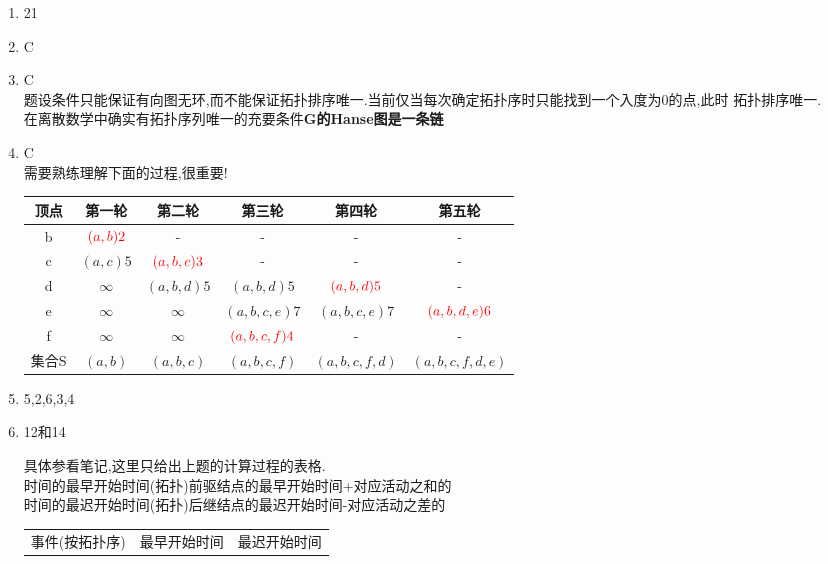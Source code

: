 \documentclass[12pt, a4paper, oneside, UTF8]{ctexbook}
\begin{document}
\begin{enumerate}[label=\arabic*.\textbf{答案}:]
\begin{center}
\begin{tikzpicture}[node distance=1.8cm,
                every node/.style={circle,draw,minimum size=6mm}]
        \end{tikzpicture}
    \end{center}
    \item 21
    \item C
    \item C \\
    题设条件只能保证有向图无环,而不能保证拓扑排序唯一.当前仅当每次确定拓扑序时只能找到一个入度为0的点,此时
    拓扑排序唯一.  \\
    在离散数学中确实有拓扑序列唯一的充要条件\textbf{G的Hanse图是一条链}
    \item C \\
    需要熟练理解下面的过程,很重要! 
    \begin{center}
    \begin{tabular}{c|c|c|c|c|c}
        \hline
        顶点 & 第一轮 & 第二轮 & 第三轮 & 第四轮 & 第五轮 \\
        \hline 
        b & $\color{red}(a,b)2$ & - & - & - & - \\
        \hline
        c & $(a,c)5$ & $\color{red}(a,b,c)3$ & - & - & - \\
        \hline 
        d & $\infty$ & $(a,b,d)5$ & $(a,b,d) 5$ & $\color{red} (a,b,d) 5$ & - \\
        \hline
        e & $\infty$ & $\infty$ & $(a,b,c,e) 7$ & $(a,b,c,e)7$ & $\color{red} (a,b,d,e)6$ \\
        \hline
        f & $\infty$ & $\infty$ & $\color{red} (a,b,c,f)4$ & - & - \\
        \hline 
        集合S & $(a,b)$ & $(a,b,c)$ & $(a,b,c,f)$ & $(a,b,c,f,d)$ & $(a,b,c,f,d,e)$ \\
        \hline
    \end{tabular}
    \end{center}
    \item 5,2,6,3,4 
    \item 12和14 
    \begin{definition}[AOE网络的计算过程] 
        具体参看笔记,这里只给出上题的计算过程的表格.\\
        时间的最早开始时间(拓扑)前驱结点的最早开始时间+对应活动之和的 \\
        时间的最迟开始时间(拓扑)后继结点的最迟开始时间-对应活动之差的 
        \begin{center}
        \begin{tabular}{p{3.5cm}|p{4.5cm}|p{4.5cm}}
            \hline
            事件(按拓扑序) & 最早开始时间 & 最迟开始时间  \\ 

\end{tabular}
\end{center}
\end{definition}
\end{enumerate}
\end{document}
